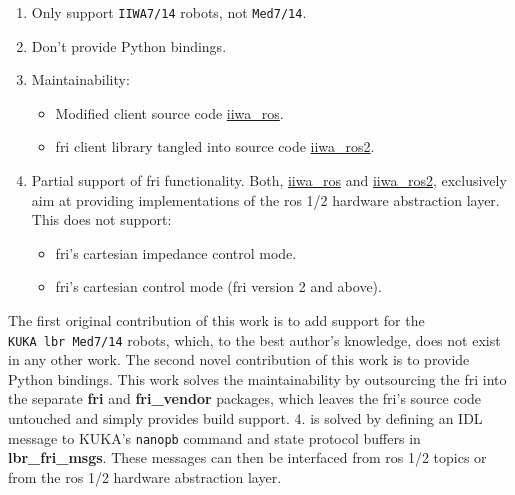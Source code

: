 \begin{enumerate}
\def\labelenumi{\arabic{enumi}.}
\item
  Only support \texttt{IIWA7/14} robots, not \texttt{Med7/14}.
\item
  Don't provide Python bindings.
\item
  Maintainability:

  \begin{itemize}
  \item
    Modified client source code
    \href{https://github.com/epfl-lasa/iiwa_ros}{iiwa\_ros}.
  \item
    \gls{fri} client library tangled into source code
    \href{https://github.com/ICube-Robotics/iiwa_ros2}{iiwa\_ros2}.
  \end{itemize}
\item
  Partial support of \gls{fri} functionality. Both,
  \href{https://github.com/epfl-lasa/iiwa_ros}{iiwa\_ros} and
  \href{https://github.com/ICube-Robotics/iiwa_ros2}{iiwa\_ros2},
  exclusively aim at providing implementations of the \gls{ros} 1/2 hardware
  abstraction layer. This does not support:

  \begin{itemize}
  \item
    \gls{fri}'s cartesian impedance control mode.
  \item
    \gls{fri}'s cartesian control mode (\gls{fri} version 2 and above).
  \end{itemize}
\end{enumerate}

The first original contribution of this work is to add support for the
\texttt{KUKA\ \gls{lbr}\ Med7/14} robots, which, to the best author's
knowledge, does not exist in any other work. The second novel
contribution of this work is to provide Python bindings. This work
solves the maintainability by outsourcing the \gls{fri} into the separate
\textbf{fri} and \textbf{fri\_vendor} packages, which leaves the \gls{fri}'s
source code untouched and simply provides build support. 4. is solved by
defining an IDL message to KUKA's \texttt{nanopb} command and state
protocol buffers in \textbf{lbr\_fri\_msgs}. These messages can then be
interfaced from \gls{ros} 1/2 topics or from the \gls{ros} 1/2 hardware abstraction
layer.

